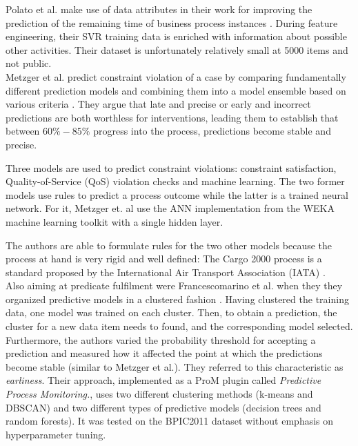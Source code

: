 Polato et al. make use of data attributes in their work for improving the prediction of the remaining time of business process instances \cite{polato2014}. During feature engineering, their SVR training data is enriched with information about possible other activities. Their dataset is unfortunately relatively small at 5000 items and not public.\\

Metzger et al. predict constraint violation of a case by comparing fundamentally different prediction models and combining them into a model ensemble based on various criteria \cite{metzger2015}. They argue that late and precise or early and incorrect predictions are both worthless for interventions, leading them to establish that between $60\% - 85\%$ progress into the process, predictions become stable and precise.

Three models are used to predict constraint violations: constraint satisfaction, Quality-of-Service (QoS) violation checks and machine learning. The two former models use rules to predict a process outcome while the latter is a trained neural network. For it, Metzger et. al use the ANN implementation from the WEKA machine learning toolkit with a single hidden layer. 

The authors are able to formulate rules for the two other models because the process at hand is very rigid and well defined: The Cargo 2000 process is a standard proposed by the International Air Transport Association (IATA) \cite{metzger2015}.\\

Also aiming at predicate fulfilment were Francescomarino et al. when they they organized predictive models in a clustered fashion \cite{francescomarino2015}. Having clustered the training data, one model was trained on each cluster. Then, to obtain a prediction, the cluster for a new data item needs to found, and the corresponding model selected. Furthermore, the authors varied the probability threshold for accepting a prediction and measured how it affected the point at which the predictions become stable (similar to Metzger et al.). They referred to this characteristic as \textit{earliness}. Their approach, implemented as a ProM plugin called \textit{Predictive Process Monitoring.}, uses two different clustering methods (k-means and DBSCAN) and two different types of predictive models (decision trees and random forests). It was tested on the BPIC2011 dataset \cite{BPIC2011} without emphasis on hyperparameter tuning.

